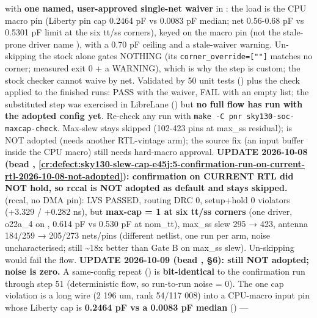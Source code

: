 \begin{record}
\begin{enumerate}
   with \textbf{one named, user-approved
  single-net waiver} in
  : the load is the
  CPU macro pin  (Liberty pin cap 0.2464 pF
  vs 0.0083 pF median; net 0.56-0.68 pF vs 0.5301 pF limit at the six
  tt/ss corners), keyed on the macro pin (not the stale-prone driver
  name ), with a 0.70 pF ceiling and a stale-waiver
  warning. \warn{} Un-skipping the stock 
  alone gates NOTHING (its
  \texttt{corner\_\allowbreak{}override=\allowbreak{}[""]} matches no
  corner; measured exit 0 + a WARNING), which is why the step is custom;
  the stock checker cannot waive by net. Validated by 50 unit tests
  () plus the check applied to
  the finished runs: PASS with the waiver, FAIL with an empty list; the
  substituted step was exercised in LibreLane () but
  \textbf{no full flow has run with the adopted config yet}. Re-check
  any run with
  \texttt{make\ -\allowbreak{}C\ pnr\ sky130-\allowbreak{}soc-\allowbreak{}maxcap-\allowbreak{}check}.
  Max-slew stays skipped (102-423 pins at max\_ss residual);
   is NOT adopted (needs
  another RTL-vintage arm); the source fix (an input buffer inside the
  CPU macro) still needs hard-macro approval. \warn{} \textbf{UPDATE
  2026-10-08 (bead , \cref{cr:defect:sky130-slew-cap-e45j:5-confirmation-run-on-current-rtl-2026-10-08-not-adopted}):
  confirmation on CURRENT RTL did NOT hold, so rccal is NOT adopted as
  default and  stays skipped.}
   (rccal, no DMA pin): LVS PASSED,
  routing DRC 0, setup+hold 0 violators (+3.329 / +0.282 ns), but
  \textbf{max-cap = 1 at six tt/ss corners} (one driver, 
  o22a\_4 on , 0.614 pF vs 0.530 pF at
  nom\_tt), max\_ss slew 295 → 423, antenna 184/259 → 205/273 nets/pins
  (different netlist, one run per arm, noise uncharacterised; still
  \textasciitilde18x better than Gate B on max\_ss slew). Un-skipping
  would fail the flow. \ok{} \textbf{UPDATE 2026-10-09 (bead
  , §6): still NOT adopted; noise is zero.} A same-config
  repeat () is \textbf{bit-identical} to
  the confirmation run through step 51 (deterministic flow, so
  run-to-run noise = 0). The one cap violation is a long wire (2 196 um,
  rank 54/117 008) into a CPU-macro input pin whose Liberty cap is
  \textbf{0.2464 pF vs a 0.0083 pF median} () ---

\end{enumerate}
\end{record}
